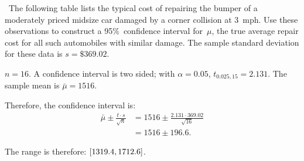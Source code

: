 \begin{problem}
  ~The following table lists the typical cost of repairing the bumper of a moderately priced midsize car damaged by a corner collision at 3~mph.  Use these observations to construct a 95\%~confidence interval for~$\mu$, the true average repair cost for all such automobiles with similar damage.  The sample standard deviation for these data is ${s = \$369.02}$.
\end{problem}

${n = 16}$. A confidence interval is two sided; with ${\alpha = 0.05}$, ${t_{0.025,15} = 2.131}$.  The sample mean is ${\bar{\mu} = 1516}$.

Therefore, the confidence interval is:
\begin{align}
  \bar{\mu} \pm \frac{t \cdot s}{\sqrt{n}} &= 1516 \pm \frac{2.131 \cdot 369.02}{\sqrt{16}} \\
                                           &= 1516 \pm 196.6 \text{.}
\end{align}

The range is therefore: $\lbrack1319.4,1712.6\rbrack$.
